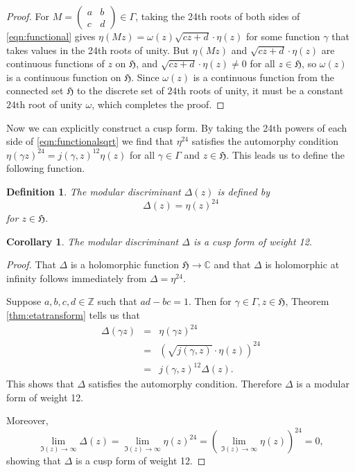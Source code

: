 \documentclass{article}
\newtheorem{definition}[theorem]{Definition}
\newtheorem{corollary}[theorem]{Corollary}
\begin{document}
\begin{proof}
For $M=\begin{pmatrix}a&b\\c&d\end{pmatrix} \in \Gamma$,
taking the 24th roots of both sides of \eqref{eqn:functional} gives
$\eta(Mz)=\omega(z)\sqrt{cz+d}\cdot \eta(z)$ for some function $\gamma$ that takes values in the 24th roots of unity. But $\eta(Mz)$ and $\sqrt{cz+d}\cdot \eta(z)$ are continuous functions of $z$ on $\mathfrak{H}$, and $\sqrt{cz+d}\cdot \eta(z) \neq 0$ for all $z \in \mathfrak{H}$, so $\omega(z)$ is a continuous function on $\mathfrak{H}$. Since $\omega(z)$ is a continuous function from the connected set $\mathfrak{H}$ to the discrete set of $24$th roots of unity, it must be a constant $24$th root of unity $\omega$, which completes the proof.
\end{proof}

Now we can explicitly construct a cusp form. By taking the 24th powers of each side of
\eqref{eqn:functionalsqrt} we find that $\eta^{24}$ satisfies the automorphy condition $\eta(\gamma z)^{24}=j(\gamma,z)^{12}\eta(z)$
for all $\gamma \in \Gamma$ and $z \in \mathfrak{H}$. This leads us to define the following function. 

\begin{definition}
The {\em modular discriminant} $\Delta(z)$ is defined
by
\[
\Delta(z)=\eta(z)^{24}
\]
for $z \in \mathfrak{H}$.
\end{definition}

\begin{corollary}
The modular discriminant
$\Delta$ is a cusp form of weight 12.
\end{corollary}
\begin{proof}
That $\Delta$ is a holomorphic function $\mathfrak{H} \to \mathbb{C}$ and that $\Delta$ is holomorphic at infinity
follows immediately from $\Delta=\eta^{24}$.


Suppose $a,b,c,d \in \mathbb{Z}$ such that $ad-bc=1$. Then for $\gamma \in \Gamma, z \in \mathfrak{H}$, Theorem \ref{thm:etatransform} tells us that
\begin{eqnarray*}
\Delta(\gamma z)&=&\eta(\gamma z)^{24}\\
&=&(\sqrt{j(\gamma,z)}\cdot \eta(z))^{24}\\
&=&j(\gamma,z)^{12}\Delta(z).
\end{eqnarray*}
This shows that $\Delta$ satisfies the automorphy condition. Therefore $\Delta$ is a modular form of weight 12.

Moreover,
\[
\lim_{\Im(z) \to \infty}\Delta(z)=\lim_{\Im(z) \to \infty} \eta(z)^{24}=(\lim_{\Im(z) \to \infty}\eta(z))^{24}=0,
\]
showing that $\Delta$ is a cusp form of weight 12.
\end{proof}
\end{document}

